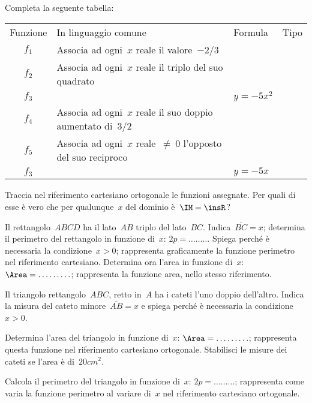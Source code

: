 \begin{esercizio}
\label{ese:\thechapter.59}
Completa la seguente tabella:
\begin{center}
 \begin{tabular}{clll}
  \toprule
  Funzione&In linguaggio comune&Formula&Tipo\\
  $f_1$&Associa ad ogni~$x$ reale il valore~$-2/3$& &\\
  $f_2$&Associa ad ogni~$x$ reale il triplo del suo quadrato& & \\
  $f_3$& &$y=-5x^2$& \\
  $f_4$&Associa ad ogni~$x$ reale il suo doppio aumentato di~$3/2$& & \\
  $f_5$&Associa ad ogni~$x$ reale~$\neq~0$ l'opposto del suo reciproco& & \\
  $f_3$& &$y=-5x$& \\
  \bottomrule
 \end{tabular}
\end{center}
Traccia nel riferimento cartesiano ortogonale le funzioni assegnate. Per quali di esse è vero che per qualunque~$x$ del dominio è~$\IM=\insR$?
\end{esercizio}

\begin{esercizio}
\label{ese:\thechapter.60}
Il rettangolo~${ABCD}$ ha il lato~${AB}$ triplo del lato~${BC}$. Indica~$\overline{BC}=x$; determina il perimetro del
rettangolo in funzione di~$x$: $2p=\ldots \ldots \ldots$
Spiega perché è necessaria la condizione~$x>0$; rappresenta graficamente la funzione perimetro nel riferimento cartesiano.
Determina ora l'area in funzione di~$x$: $\Area=\ldots \ldots \ldots$; rappresenta la funzione area, nello stesso riferimento.
\end{esercizio}

\begin{esercizio}
\label{ese:\thechapter.61}
Il triangolo rettangolo~${ABC}$, retto in~$A$ ha i cateti l'uno doppio dell'altro. Indica la misura del cateto minore~$\overline{AB}=x$
e spiega perché è necessaria la condizione~$x>0$.

Determina l'area del triangolo in funzione di~$x$: $\Area=\ldots \ldots \ldots$;
rappresenta questa funzione nel riferimento cartesiano ortogonale.
Stabilisci le misure dei cateti se l'area è di~$20\unit{cm^2}$.

Calcola il perimetro del triangolo in funzione di~$x$: $2p=\ldots \ldots \ldots$; rappresenta come varia la funzione perimetro al variare di~$x$ nel riferimento cartesiano ortogonale.
\end{esercizio}

